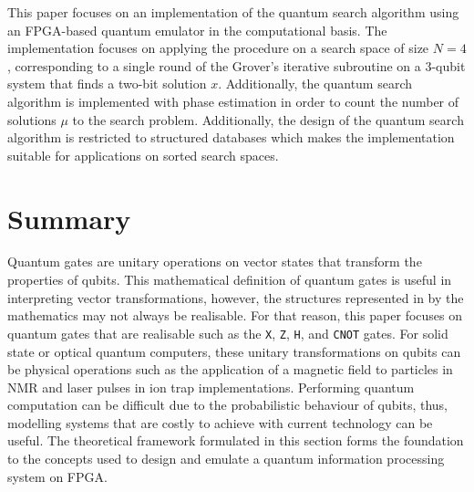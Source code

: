 This paper focuses on an implementation of the quantum search algorithm using an FPGA-based quantum emulator in the computational basis. The implementation focuses on applying the procedure on a search space of size $N = 4$, corresponding to a single round of the Grover's iterative subroutine on a 3-qubit system that finds a two-bit solution $x$. Additionally, the quantum search algorithm is implemented with phase estimation in order to count the number of solutions $\mu$ to the search problem. Additionally, the design of the quantum search algorithm is restricted to structured databases which makes the implementation suitable for applications on sorted search spaces. 
 
\section{Summary \label{sec:ch2-conclusion}}
Quantum gates are unitary operations on vector states that transform the properties of qubits. This mathematical definition of quantum gates is useful in interpreting vector transformations, however, the structures represented in by the mathematics may not always be realisable. For that reason, this paper focuses on quantum gates that are realisable such as the \texttt{X}, \texttt{Z}, \texttt{H}, and \texttt{CNOT} gates. For solid state or optical quantum computers, these unitary transformations on qubits can be physical operations such as the application of a magnetic field to particles in NMR and laser pulses in ion trap implementations\cite{Rieffel2011}. Performing quantum computation can be difficult due to the probabilistic behaviour of qubits, thus, modelling systems that are costly to achieve with current technology can be useful. The theoretical framework formulated in this section forms the foundation to the concepts used to design and emulate a quantum information processing system on FPGA.